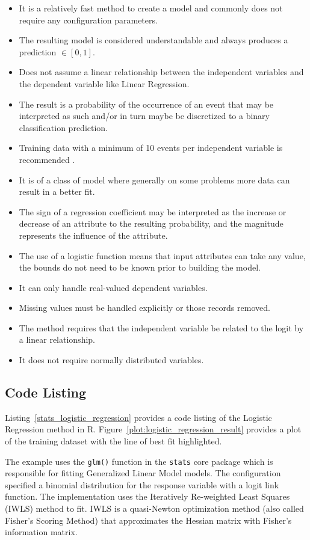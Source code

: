 \begin{itemize}
	\item It is a relatively fast method to create a model and commonly does not require any configuration parameters.
	\item The resulting model is considered understandable and always produces a prediction $\in[0,1]$.	
	\item Does not assume a linear relationship between the independent variables and the dependent variable like Linear Regression. 
	\item The result is a probability of the occurrence of an event that may be interpreted as such and/or in turn maybe be discretized to a binary classification prediction.
	\item Training data with a minimum of 10 events per independent variable is recommended \cite{Peduzzi1996}.
	\item It is of a class of model where generally on some problems more data can result in a better fit.
	\item The sign of a regression coefficient may be interpreted as the increase or decrease of an attribute to the resulting probability, and the magnitude represents the influence of the attribute.
	\item The use of a logistic function means that input attributes can take any value, the bounds do not need to be known prior to building the model.
	\item It can only handle real-valued dependent variables.
	\item Missing values must be handled explicitly or those records removed.
	\item The method requires that the independent variable be related to the logit by a linear relationship.
	\item It does not require normally distributed variables.	
\end{itemize}


\subsection{Code Listing}
Listing~\ref{stats_logistic_regression} provides a code listing of the Logistic Regression method in R. Figure~\ref{plot:logistic_regression_result} provides a plot of the training dataset with the line of best fit highlighted.

The example uses the \texttt{glm()} function in the \texttt{stats} core package which is responsible for fitting Generalized Linear Model models. The configuration specified a binomial distribution for the response variable with a logit link function. The implementation uses the Iteratively Re-weighted Least Squares (IWLS) method to fit. IWLS is a quasi-Newton optimization method (also called Fisher's Scoring Method) that approximates the Hessian matrix with Fisher's information matrix.

